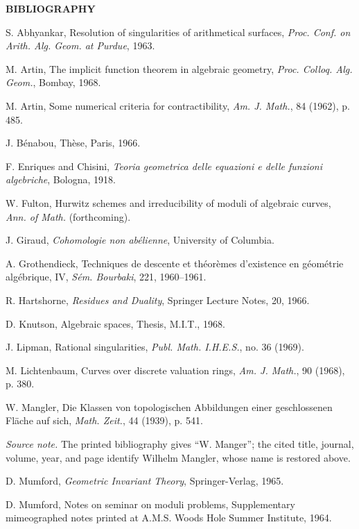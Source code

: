 \documentclass[10pt]{article}
\begin{document}
\begin{center}
{\bfseries BIBLIOGRAPHY}
\end{center}

\begin{description}[leftmargin=2.4em,labelwidth=2.1em,itemsep=0.05em]
\item[{[Ab]}] S. Abhyankar, Resolution of singularities of arithmetical surfaces, \emph{Proc. Conf. on Arith. Alg. Geom. at Purdue}, 1963.
\item[{[A$_1$]}] M. Artin, The implicit function theorem in algebraic geometry, \emph{Proc. Colloq. Alg. Geom.}, Bombay, 1968.
\item[{[A$_2$]}] M. Artin, Some numerical criteria for contractibility, \emph{Am. J. Math.}, 84 (1962), p. 485.
\item[{[B]}] J. Bénabou, Thèse, Paris, 1966.
\item[{[E]}] F. Enriques and Chisini, \emph{Teoria geometrica delle equazioni e delle funzioni algebriche}, Bologna, 1918.
\item[{[F]}] W. Fulton, Hurwitz schemes and irreducibility of moduli of algebraic curves, \emph{Ann. of Math.} (forthcoming).
\item[{[G]}] J. Giraud, \emph{Cohomologie non abélienne}, University of Columbia.
\item[{[Gr]}] A. Grothendieck, Techniques de descente et théorèmes d'existence en géométrie algébrique, IV, \emph{Sém. Bourbaki}, 221, 1960--1961.
\item[{[H]}] R. Hartshorne, \emph{Residues and Duality}, Springer Lecture Notes, 20, 1966.
\item[{[K]}] D. Knutson, Algebraic spaces, Thesis, M.I.T., 1968.
\item[{[Li]}] J. Lipman, Rational singularities, \emph{Publ. Math. I.H.E.S.}, no. 36 (1969).
\item[{[L]}] M. Lichtenbaum, Curves over discrete valuation rings, \emph{Am. J. Math.}, 90 (1968), p. 380.
\item[{[Ma]}] W. Mangler, Die Klassen von topologischen Abbildungen einer geschlossenen Fläche auf sich, \emph{Math. Zeit.}, 44 (1939), p. 541.
\par\textit{Source note.} The printed bibliography gives ``W. Manger''; the cited title, journal, volume, year, and page identify Wilhelm Mangler, whose name is restored above.
\item[{[M$_1$]}] D. Mumford, \emph{Geometric Invariant Theory}, Springer-Verlag, 1965.
\item[{[M$_2$]}] D. Mumford, Notes on seminar on moduli problems, Supplementary mimeographed notes printed at A.M.S. Woods Hole Summer Institute, 1964.

\end{description}
\end{document}
